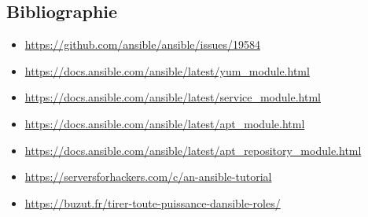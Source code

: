 \documentclass[a4paper, 12pt]{article}
\begin{document}
\subsection{Bibliographie}
\begin{itemize}
    \item \url{https://github.com/ansible/ansible/issues/19584}
    \item \url{https://docs.ansible.com/ansible/latest/yum_module.html}
    \item \url{https://docs.ansible.com/ansible/latest/service_module.html}
    \item \url{https://docs.ansible.com/ansible/latest/apt_module.html}
    \item \url{https://docs.ansible.com/ansible/latest/apt_repository_module.html}
    \item \url{https://serversforhackers.com/c/an-ansible-tutorial}
    \item \url{https://buzut.fr/tirer-toute-puissance-dansible-roles/}
\end{itemize}
\end{document}
